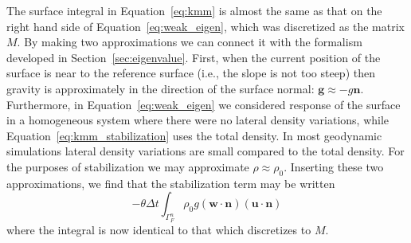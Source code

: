 \documentclass[preprint,12pt,authoryear]{elsarticle}
\begin{document}
The surface integral in Equation~\eqref{eq:kmm} is almost the same as that on the right hand side of 
Equation~\eqref{eq:weak_eigen}, which was discretized as the matrix $M$.
By making two approximations we can connect it with the formalism developed in Section~\ref{sec:eigenvalue}.
First, when the current position of the surface is near to the reference surface (i.e., the slope is not too steep)
then gravity is approximately in the direction of the surface normal: $\mathbf{g} \approx -g \mathbf{n}$.
Furthermore, in Equation~\eqref{eq:weak_eigen} we considered response of the surface in a homogeneous system where there were no lateral density variations,
while Equation~\eqref{eq:kmm_stabilization} uses the total density.
In most geodynamic simulations lateral density variations are small compared to the total density.
For the purposes of stabilization we may approximate $\rho \approx \rho_0$.
Inserting these two approximations, we find that the stabilization term may be written
\begin{equation}
-\theta \Delta t \int_{\Gamma_F^n} \rho_0 g ( \mathbf{w \cdot n}) (\mathbf{u \cdot n} )
\label{eq:kmm_stabilization}
\end{equation}
where the integral is now identical to that which discretizes to $M$.
\end{document}

